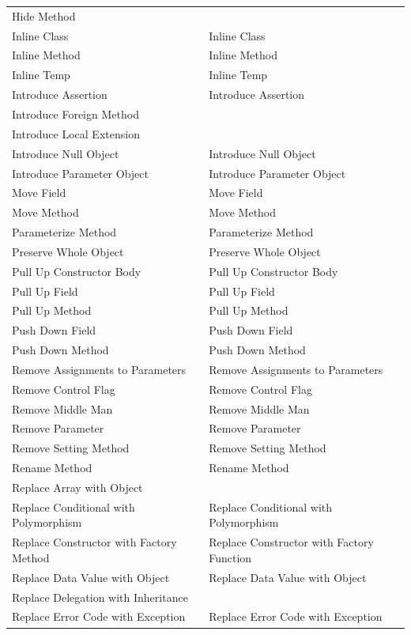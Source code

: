 \documentclass[11pt,a4paper,oneside]{book}
\begin{document}
\begin{longtable}{|p{200pt}|p{200pt}|}
    Hide Method & \\ 
    Inline Class & Inline Class\\ 
    Inline Method & Inline Method\\ 
    Inline Temp & Inline Temp\\ 
    Introduce Assertion & Introduce Assertion\\ 
    Introduce Foreign Method & \\ 
    Introduce Local Extension & \\ 
    Introduce Null Object & Introduce Null Object\\ 
    Introduce Parameter Object & Introduce Parameter Object\\ 
    Move Field & Move Field\\ 
    Move Method & Move Method\\ 
    Parameterize Method & Parameterize Method\\ 
    Preserve Whole Object & Preserve Whole Object\\ 
    Pull Up Constructor Body & Pull Up Constructor Body\\ 
    Pull Up Field & Pull Up Field\\ 
    Pull Up Method & Pull Up Method\\ 
    Push Down Field & Push Down Field\\ 
    Push Down Method & Push Down Method\\ 
    Remove Assignments to Parameters & Remove Assignments to Parameters \\ 
    Remove Control Flag & Remove Control Flag\\ 
    Remove Middle Man & Remove Middle Man\\ 
    Remove Parameter & Remove Parameter \\ 
    Remove Setting Method & Remove Setting Method\\ 
    Rename Method & Rename Method\\ 
    Replace Array with Object & \\ 
    Replace Conditional with Polymorphism & Replace Conditional with Polymorphism\\ 
    Replace Constructor with Factory Method & Replace Constructor with Factory Function\\ 
    Replace Data Value with Object & Replace Data Value with Object\\ 
    Replace Delegation with Inheritance & \\ 
    Replace Error Code with Exception & Replace Error Code with Exception\\ 

\end{longtable}
\end{document}
